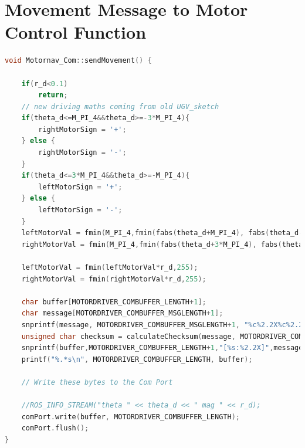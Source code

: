 \documentclass[titlepage,12pt,a4paper]{article}
\begin{document}
\section{Movement Message to Motor Control Function}
\label{appendix:motor_controller}
\begin{lstlisting}[language=C++]
void Motornav_Com::sendMovement() {

	if(r_d<0.1) 
		return;
	// new driving maths coming from old UGV_sketch
	if(theta_d<=M_PI_4&&theta_d>=-3*M_PI_4){
		rightMotorSign = '+';
	} else {
		rightMotorSign = '-';
	}
	if(theta_d<=3*M_PI_4&&theta_d>=-M_PI_4){
		leftMotorSign = '+';
	} else {
		leftMotorSign = '-';
	}
	leftMotorVal = fmin(M_PI_4,fmin(fabs(theta_d+M_PI_4), fabs(theta_d-3*M_PI_4)))*255/M_PI_4;
	rightMotorVal = fmin(M_PI_4,fmin(fabs(theta_d+3*M_PI_4), fabs(theta_d-M_PI_4)))*255/M_PI_4;
	
	leftMotorVal = fmin(leftMotorVal*r_d,255);
	rightMotorVal = fmin(rightMotorVal*r_d,255);
	
	char buffer[MOTORDRIVER_COMBUFFER_LENGTH+1];
	char message[MOTORDRIVER_COMBUFFER_MSGLENGTH+1];
	snprintf(message, MOTORDRIVER_COMBUFFER_MSGLENGTH+1, "%c%2.2X%c%2.2X", leftMotorSign, leftMotorVal, rightMotorSign, rightMotorVal);
	unsigned char checksum = calculateChecksum(message, MOTORDRIVER_COMBUFFER_MSGLENGTH);
	snprintf(buffer,MOTORDRIVER_COMBUFFER_LENGTH+1,"[%s:%2.2X]",message,checksum);
	printf("%.*s\n", MOTORDRIVER_COMBUFFER_LENGTH, buffer);
	
	// Write these bytes to the Com Port
	
	//ROS_INFO_STREAM("theta " << theta_d << " mag " << r_d);
	comPort.write(buffer, MOTORDRIVER_COMBUFFER_LENGTH);
	comPort.flush();
}
\end{lstlisting}
\end{document}
